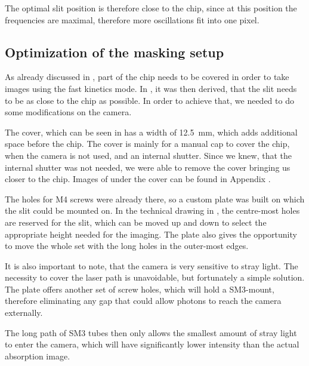 The optimal slit position is therefore close to the chip, since at this position the frequencies are maximal, therefore more oscillations fit into one pixel.
\newpage
\subsection{Optimization of the masking setup}
\label{subsec:slit_optim}
As already discussed in , part of the chip needs to be covered in order to take images using the fast kinetics mode. In , it was then derived, that the slit needs to be as close to the chip as possible. In order to achieve that, we needed to do some modifications on the camera.

 

The cover, which can be seen in  has a width of \SI{12.5}{\milli\meter}, which adds additional space before the chip. The cover is mainly for a manual cap to cover the chip, when the camera is not used, and an internal shutter. Since we knew, that the internal shutter was not needed, we were able to remove the cover bringing us closer to the chip. Images of under the cover can be found in Appendix .

The holes for M4 screws were already there, so a custom plate was built on which the slit could be mounted on.
In the technical drawing in , the centre-most holes are reserved for the slit, which can be moved up and down to select the appropriate height needed for the imaging.
The plate also gives the opportunity to move the whole set with the long holes in the outer-most edges.

It is also important to note, that the camera is very sensitive to stray light. The necessity to cover the laser path is unavoidable, but fortunately a simple solution. The plate offers another set of screw holes, which will hold a SM3-mount, therefore eliminating any gap that could allow photons to reach the camera externally.

The long path of SM3 tubes then only allows the smallest amount of stray light to enter the camera, which will have significantly lower intensity than the actual absorption image.
